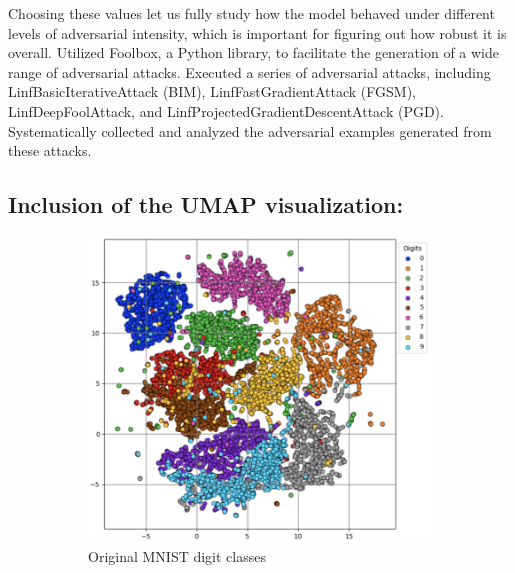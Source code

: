 \documentclass[10pt, conference, a4paper, final]{IEEEtran}
\begin{document}
Choosing these values let us fully study how the model behaved under different levels of adversarial intensity, which is important for figuring out how robust it is overall.
Utilized Foolbox, a Python library, to facilitate the generation of a wide range of adversarial attacks.
Executed a series of adversarial attacks, including LinfBasicIterativeAttack (BIM), LinfFastGradientAttack (FGSM), LinfDeepFoolAttack, and LinfProjectedGradientDescentAttack (PGD). Systematically collected and analyzed the adversarial examples generated from these attacks.


\subsection{Inclusion of the UMAP visualization:}

\begin{figure}[!ht]
    \centering
    \begin{subfigure}{.31\textwidth}
        \centering
        \includegraphics[width=\linewidth]{paper_images/UMAP_mnist.png}
        \caption{Original MNIST digit classes}
        \label{fig:umap_original}
    \end{subfigure}%
    \hfill
    \begin{subfigure}{.34\textwidth}
        \centering

\end{subfigure}
\end{figure}
\end{document}
